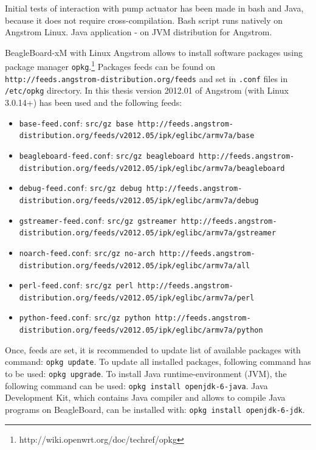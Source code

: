 Initial tests of interaction with pump actuator has been made in bash and Java, because it does not require cross-compilation. Bash script runs natively on Angstrom Linux. Java application - on JVM distribution for Angstrom. 

BeagleBoard-xM with Linux Angstrom allows to install software packages using package manager \lstinline{opkg}.\footnote{http://wiki.openwrt.org/doc/techref/opkg} Packages feeds can be found on \lstinline{http://feeds.angstrom-distribution.org/feeds} and set in \lstinline{.conf} files in \lstinline{/etc/opkg} directory. In this thesis version 2012.01 of Angstrom (with Linux 3.0.14+) has been used and the following feeds:
\begin{itemize}
	\item \lstinline{base-feed.conf}: \lstinline{src/gz base http://feeds.angstrom-distribution.org/feeds/v2012.05/ipk/eglibc/armv7a/base}
	\item \lstinline{beagleboard-feed.conf}: \lstinline{src/gz beagleboard http://feeds.angstrom-distribution.org/feeds/v2012.05/ipk/eglibc/armv7a/beagleboard}
	\item \lstinline{debug-feed.conf}: \lstinline{src/gz debug http://feeds.angstrom-distribution.org/feeds/v2012.05/ipk/eglibc/armv7a/debug}
	\item \lstinline{gstreamer-feed.conf}: \lstinline{src/gz gstreamer http://feeds.angstrom-distribution.org/feeds/v2012.05/ipk/eglibc/armv7a/gstreamer}
	\item \lstinline{noarch-feed.conf}: \lstinline{src/gz no-arch http://feeds.angstrom-distribution.org/feeds/v2012.05/ipk/eglibc/armv7a/all}
	\item \lstinline{perl-feed.conf}: \lstinline{src/gz perl http://feeds.angstrom-distribution.org/feeds/v2012.05/ipk/eglibc/armv7a/perl}
	\item \lstinline{python-feed.conf}: \lstinline{src/gz python http://feeds.angstrom-distribution.org/feeds/v2012.05/ipk/eglibc/armv7a/python}
\end{itemize}

Once, feeds are set, it is recommended to update list of available packages with command: \lstinline{opkg update}. To update all installed packages, following command has to be used: \lstinline{opkg upgrade}. To install Java runtime-environment (JVM), the following command can be used: \lstinline{opkg install openjdk-6-java}. Java Development Kit, which contains Java compiler and allows to compile Java programs on BeagleBoard, can be installed with: \lstinline{opkg install openjdk-6-jdk}.


